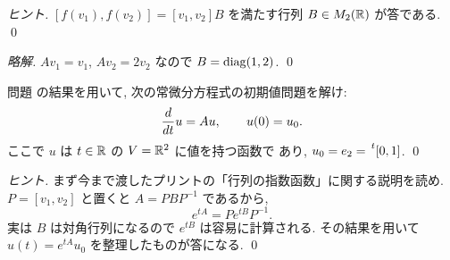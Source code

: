\documentclass[12pt,twoside]{jarticle}
\newcommand\commentout[1]{#1}
\newcommand\commentout[1]{}
\begin{document}
\begin{proof}[ヒント]
  $[f(v_1),f(v_2)]=[v_1,v_2]B$ を満たす行列 $B\in M_2({\mathbb R})$ が答である.
  \qed
\end{proof}

\commentout{
\begin{proof}[略解]
  $Av_1=v_1$, $Av_2=2v_2$ なので $B=\mathop{\mathrm{diag}}\nolimits(1,2)$. \qed
\end{proof}
}


\begin{question}[10点]
  \label{q:9,-2,-2,6-ODE}
  問題  の結果を用いて,
  次の常微分方程式の初期値問題を解け:
  \begin{equation*}
    \frac{d}{d t}u = Au, \qquad u(0) = u_0.
  \end{equation*}
  ここで $u$ は $t\in{\mathbb R}$ の $V={\mathbb R}^2$ に値を持つ函数で
  あり, $u_0 = e_2 = \tp{[0,1]}$.
  \qed
\end{question}

\begin{proof}[ヒント]
  まず今まで渡したプリントの「行列の指数函数」に関する説明を読め.
  $P = [v_1,v_2]$ と置くと $A=PBP^{-1}$ であるから,
  \begin{equation*}
    e^{tA} = Pe^{tB}P^{-1}.
  \end{equation*}
  実は $B$ は対角行列になるので $e^{tB}$ は容易に計算される.
  その結果を用いて $u(t) = e^{tA}u_0$ を整理したものが答になる.
  \qed
\end{proof}
\end{document}
